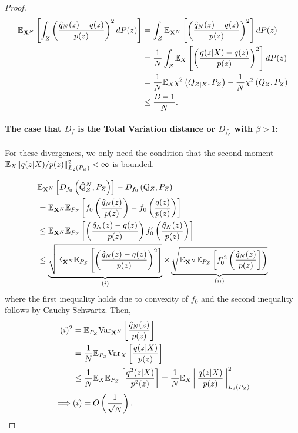 \begin{proof}
\begin{align*}
 \mathbb{E}_{\mathbf{X}^N}\left[ \int_Z  \left(\frac{\hat{q}_N(z) - q(z)}{p(z)}\right)^2 dP(z) \right] &= \int_Z \mathbb{E}_{\mathbf{X}^N}\left[  \left(\frac{\hat{q}_N(z) - q(z)}{p(z)}\right)^2 \right] dP(z) \\
 &=\frac{1}{N} \int_Z \mathbb{E}_{X}\left[  \left(\frac{q(z|X) - q(z)}{p(z)}\right)^2 \right] dP(z) \\
 &= \frac{1}{N} \mathbb{E}_{X} \chi^2\left( Q_{Z|X} , P_Z \right) - \frac{1}{N} \chi^2\left( Q_{Z} , P_Z \right)\\
 &\leq \frac{B-1}{N}.
\end{align*}

\paragraph{The case that $D_f$ is the Total Variation distance or $D_{f_\beta}$ with $\beta>1$:}

For these divergences, we only need the condition that the second moment $\mathbb{E}_X \| q(z|X)/p(z)\|^2_{L_2(P_Z)} < \infty$ is bounded.

\begin{align*}
    & \mathbb{E}_{\mathbf{X}^N} \left[ D_{f_0}\left( \hat{Q}_Z^N , P_Z\right)\right] - D_{f_0}\left( Q_{Z} , P_Z\right)  \\
    &= \mathbb{E}_{\mathbf{X}^N}\mathbb{E}_{P_Z} \left[ f_0\left( \frac{\hat{q}_N(z)}{p(z)} \right) - f_0\left( \frac{q(z)}{p(z)} \right) \right] \\
    &\leq \mathbb{E}_{\mathbf{X}^N}\mathbb{E}_{P_Z} \left[ \left( \frac{\hat{q}_N(z) - q(z)}{p(z)} \right)     f_0'\left(\frac{\hat{q}_N(z)}{p(z)} \right) \right]  \\
    &\leq \underbrace{ \sqrt{ \mathbb{E}_{\mathbf{X}^N}\mathbb{E}_{P_Z} \left[\left( \frac{\hat{q}_N(z) - q(z)}{p(z)} \right)^2\right] }}_{(i)} 
    \times 
    \underbrace{\sqrt{\mathbb{E}_{\mathbf{X}^N}\mathbb{E}_{P_Z} \left[ f_0'^2\left(\frac{\hat{q}_N(z)}{p(z)}\right] \right) }}_{(ii)}
\end{align*}
where the first inequality holds due to convexity of $f_0$ and the second inequality follows by Cauchy-Schwartz.
Then,
\begin{align*}
    (i)^2 
    &= \mathbb{E}_{P_Z} \text{Var}_{\mathbf{X}^N}\left[\frac{\hat{q}_N(z)}{p(z)} \right]\\
    &= \frac{1}{N}\mathbb{E}_{P_Z} \text{Var}_{X}\left[\frac{q(z|X)}{p(z)} \right]\\
    &\leq \frac{1}{N}\mathbb{E}_{X} \mathbb{E}_{P_Z} \left[ \frac{q^2(z|X)}{p^2(z)} \right] = \frac{1}{N} \mathbb{E}_X \left\| \frac{q(z|X)}{p(z)} \right\|^2_{L_2(P_Z)}\\
    \implies & (i) = O\left(\frac{1}{\sqrt{N}}\right).
\end{align*}


\end{proof}
